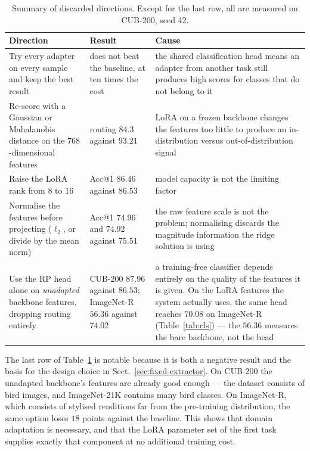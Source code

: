 \documentclass[11pt,a4paper]{article}
\begin{document}
\begin{table}[htbp]
\centering
\caption{Summary of discarded directions. Except for the last row, all are
measured on CUB-200, seed 42.}
\label{tab:closed}
\begin{tabular}{@{}p{4.6cm}p{4.0cm}p{4.4cm}@{}}
\toprule
Direction & Result & Cause \\
\midrule
Try every adapter on every sample and keep the best result
  & does not beat the baseline, at ten times the cost
  & the shared classification head means an adapter from another task still
    produces high scores for classes that do not belong to it \\
\addlinespace
Re-score with a Gaussian or Mahalanobis distance on the $768$-dimensional
features
  & routing $84.3$ against $93.21$
  & LoRA on a frozen backbone changes the features too little to produce an
    in-distribution versus out-of-distribution signal \\
\addlinespace
Raise the LoRA rank from $8$ to $16$
  & Acc@1 $86.46$ against $86.53$
  & model capacity is not the limiting factor \\
\addlinespace
Normalise the features before projecting ($\ell_2$, or divide by the mean norm)
  & Acc@1 $74.96$ and $74.92$ against $75.51$
  & the raw feature scale is not the problem; normalising discards the magnitude
    information the ridge solution is using \\
\addlinespace
Use the RP head alone on \emph{unadapted} backbone features, dropping routing
entirely
  & CUB-200 $87.96$ against $86.53$; ImageNet-R $56.36$ against $74.02$
  & a training-free classifier depends entirely on the quality of the features
    it is given. On the LoRA features the system actually uses, the same head
    reaches $70.08$ on ImageNet-R (Table~\ref{tab:cls}) --- the $56.36$
    measures the bare backbone, not the head \\
\bottomrule
\end{tabular}
\end{table}

The last row of Table~\ref{tab:closed} is notable because it is both a negative
result and the basis for the design choice in
Sect.~\ref{sec:fixed-extractor}. On CUB-200 the unadapted backbone's features
are already good enough --- the dataset consists of bird images, and ImageNet-21K
contains many bird classes. On ImageNet-R, which consists of stylised renditions
far from the pre-training distribution, the same option loses $18$ points against
the baseline. This shows that domain adaptation is necessary, and that the LoRA
parameter set of the first task supplies exactly that component at no additional
training cost.
\end{document}
